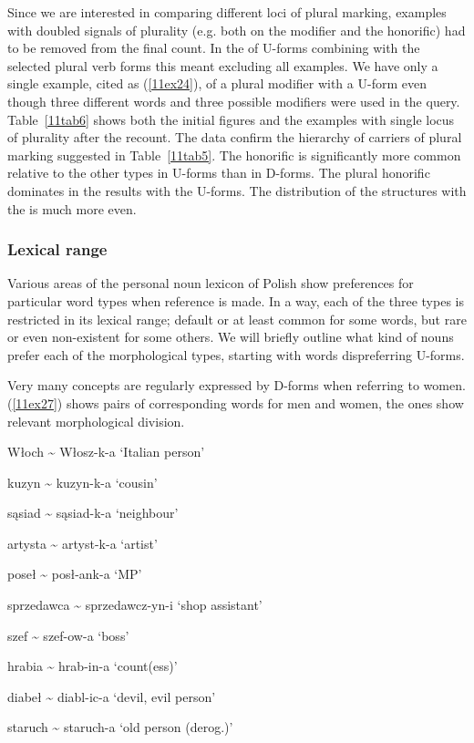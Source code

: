 \documentclass[output=paper,colorlinks,citecolor=brown]{langscibook}
\begin{document}
Since we are interested in comparing different loci of plural marking, examples with doubled signals of plurality (e.g. both on the modifier and the honorific) had to be removed from the final count. In the  of U-forms combining with the selected plural verb forms this meant excluding all examples. We have only a single example, cited as (\ref{11ex24}), of a plural modifier with a U-form even though three different words and three possible modifiers were used in the query. Table~\ref{11tab6} shows both the initial figures and the examples with single locus of plurality after the recount. The data confirm the hierarchy of carriers of plural marking suggested in Table~\ref{11tab5}. The honorific is significantly more common relative to the other types in U-forms than in D-forms. The plural honorific dominates in the results with the U-forms. The distribution of the structures with the  is much more even.

\subsubsection{Lexical range} \label{11sec3.3.3}

Various areas of the personal noun lexicon of Polish show preferences for particular word types when  reference is made. In a way, each of the three types is restricted in its lexical range; default or at least common for some words, but rare or even non-existent for some others. We will briefly outline what kind of nouns prefer each of the morphological types, starting with words dispreferring U-forms.

Very many concepts are regularly expressed by D-forms when referring to women. (\ref{11ex27}) shows pairs of corresponding words for men and women, the  ones show relevant morphological division.

\begin{exe}
	\ex \label{11ex27}
	\begin{xlist}
		\ex \label{11ex27a} Włoch {\sim} Włosz-k-a
		\trans ‘Italian person’
		
		\ex \label{11ex27b} kuzyn {\sim} kuzyn-k-a
		\trans ‘cousin’
		
		\ex \label{11ex27c} sąsiad {\sim} sąsiad-k-a
		\trans ‘neighbour’
		
		\ex \label{11ex27d} artysta {\sim} artyst-k-a
		\trans ‘artist’
		
		\ex \label{11ex27e} poseł {\sim} posł-ank-a
		\trans ‘MP’
		
		\ex \label{11ex27f} sprzedawca {\sim} sprzedawcz-yn-i
		\trans ‘shop assistant’
		
		\ex \label{11ex27g} szef {\sim} szef-ow-a
		\trans ‘boss’
		
		\ex\label{11ex27h} hrabia {\sim} hrab-in-a
		\trans ‘count(ess)’
		
		\ex\label{11ex27i} diabeł {\sim} diabl-ic-a
		\trans ‘devil, evil person’
		
		\ex \label{11ex27j} staruch {\sim} staruch-a
		\trans ‘old person (derog.)’
	\end{xlist}
\end{exe}
\end{document}
